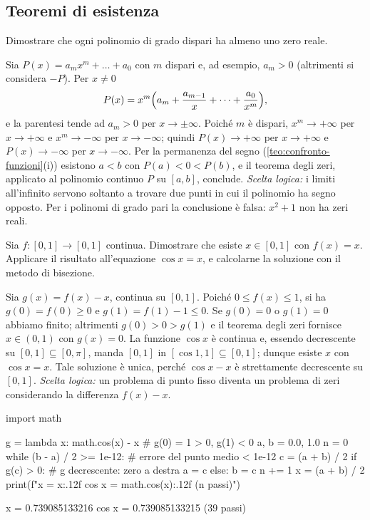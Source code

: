 \subsection*{Teoremi di esistenza}

\begin{esercizio}\label{es:grado-dispari}
Dimostrare che ogni polinomio di grado dispari ha almeno uno zero reale.
\begin{soluzione}
Sia $P(x)=a_{m}x^{m}+\dots+a_{0}$ con $m$ dispari e, ad esempio, $a_{m}>0$ (altrimenti si
considera $-P$). Per $x\neq0$
\[
  P(x)=x^{m}\Bigl(a_{m}+\frac{a_{m-1}}x+\dots+\frac{a_{0}}{x^{m}}\Bigr),
\]
e la parentesi tende ad $a_{m}>0$ per $x\to\pm\infty$. Poiché $m$ è dispari,
$x^{m}\to+\infty$ per $x\to+\infty$ e $x^{m}\to-\infty$ per $x\to-\infty$; quindi
$P(x)\to+\infty$ per $x\to+\infty$ e $P(x)\to-\infty$ per $x\to-\infty$. Per la
permanenza del segno (\cref{teo:confronto-funzioni}(i)) esistono $a<b$ con $P(a)<0<P(b)$,
e il teorema degli zeri, applicato al polinomio continuo $P$ su $[a,b]$, conclude.
\emph{Scelta logica:} i limiti all'infinito servono soltanto a trovare due punti in cui
il polinomio ha segno opposto. Per i polinomi di grado pari la conclusione è falsa:
$x^{2}+1$ non ha zeri reali.
\end{soluzione}
\end{esercizio}

\begin{esercizio}\label{es:punto-fisso}
Sia $f:[0,1]\to[0,1]$ continua. Dimostrare che esiste $x\in[0,1]$ con $f(x)=x$.
Applicare il risultato all'equazione $\cos x=x$, e calcolarne la soluzione con il metodo
di bisezione.
\begin{soluzione}
Sia $g(x)=f(x)-x$, continua su $[0,1]$. Poiché $0\le f(x)\le1$, si ha $g(0)=f(0)\ge0$ e
$g(1)=f(1)-1\le0$. Se $g(0)=0$ o $g(1)=0$ abbiamo finito; altrimenti $g(0)>0>g(1)$ e il
teorema degli zeri fornisce $x\in(0,1)$ con $g(x)=0$. La funzione $\cos x$ è continua e,
essendo decrescente su $[0,1]\subseteq[0,\pi]$, manda $[0,1]$ in
$[\cos1,1]\subseteq[0,1]$; dunque esiste $x$ con $\cos x=x$. Tale soluzione è unica,
perché $\cos x-x$ è strettamente decrescente su $[0,1]$. \emph{Scelta logica:} un
problema di punto fisso diventa un problema di zeri considerando la differenza
$f(x)-x$.
\end{soluzione}
\end{esercizio}

\begin{python}[La soluzione di $\cos x=x$]
import math

g = lambda x: math.cos(x) - x      # g(0) = 1 > 0, g(1) < 0
a, b = 0.0, 1.0
n = 0
while (b - a) / 2 >= 1e-12:        # errore del punto medio < 1e-12
    c = (a + b) / 2
    if g(c) > 0:                   # g decrescente: zero a destra
        a = c
    else:
        b = c
    n += 1
x = (a + b) / 2
print(f"x = {x:.12f}   cos x = {math.cos(x):.12f}   ({n} passi)")
\end{python}
\begin{risultato}
x = 0.739085133216   cos x = 0.739085133215   (39 passi)
\end{risultato}

